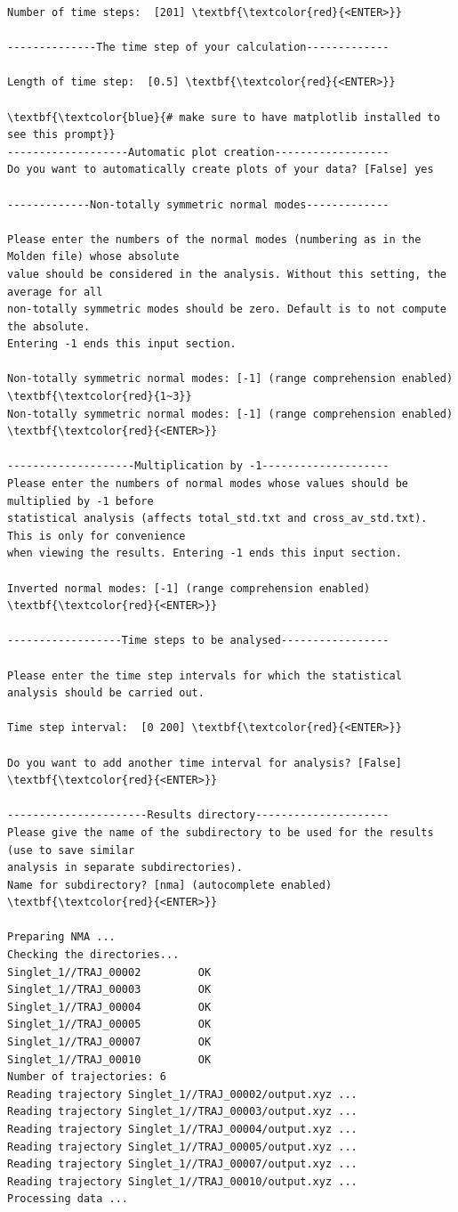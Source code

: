 \documentclass[a4paper,11pt,DIV=15,openany]{scrbook}
\begin{document}
\begin{oframed}
\begin{Verbatim}[commandchars=\\\{\}]
Number of time steps:  [201] \textbf{\textcolor{red}{<ENTER>}}

--------------The time step of your calculation-------------

Length of time step:  [0.5] \textbf{\textcolor{red}{<ENTER>}}

\textbf{\textcolor{blue}{# make sure to have matplotlib installed to see this prompt}}
-------------------Automatic plot creation------------------
Do you want to automatically create plots of your data? [False] yes 

-------------Non-totally symmetric normal modes-------------

Please enter the numbers of the normal modes (numbering as in the Molden file) whose absolute 
value should be considered in the analysis. Without this setting, the average for all 
non-totally symmetric modes should be zero. Default is to not compute the absolute. 
Entering -1 ends this input section.

Non-totally symmetric normal modes: [-1] (range comprehension enabled) \textbf{\textcolor{red}{1~3}}
Non-totally symmetric normal modes: [-1] (range comprehension enabled) \textbf{\textcolor{red}{<ENTER>}}

--------------------Multiplication by -1--------------------
Please enter the numbers of normal modes whose values should be multiplied by -1 before 
statistical analysis (affects total_std.txt and cross_av_std.txt). This is only for convenience
when viewing the results. Entering -1 ends this input section.

Inverted normal modes: [-1] (range comprehension enabled) \textbf{\textcolor{red}{<ENTER>}}

------------------Time steps to be analysed-----------------

Please enter the time step intervals for which the statistical analysis should be carried out. 

Time step interval:  [0 200] \textbf{\textcolor{red}{<ENTER>}}

Do you want to add another time interval for analysis? [False] \textbf{\textcolor{red}{<ENTER>}}

----------------------Results directory---------------------
Please give the name of the subdirectory to be used for the results (use to save similar 
analysis in separate subdirectories).
Name for subdirectory? [nma] (autocomplete enabled) \textbf{\textcolor{red}{<ENTER>}}

Preparing NMA ...
Checking the directories...
Singlet_1//TRAJ_00002         OK
Singlet_1//TRAJ_00003         OK
Singlet_1//TRAJ_00004         OK
Singlet_1//TRAJ_00005         OK
Singlet_1//TRAJ_00007         OK
Singlet_1//TRAJ_00010         OK
Number of trajectories: 6
Reading trajectory Singlet_1//TRAJ_00002/output.xyz ...
Reading trajectory Singlet_1//TRAJ_00003/output.xyz ...
Reading trajectory Singlet_1//TRAJ_00004/output.xyz ...
Reading trajectory Singlet_1//TRAJ_00005/output.xyz ...
Reading trajectory Singlet_1//TRAJ_00007/output.xyz ...
Reading trajectory Singlet_1//TRAJ_00010/output.xyz ...
Processing data ...
\end{Verbatim}
\end{oframed}
\end{document}
